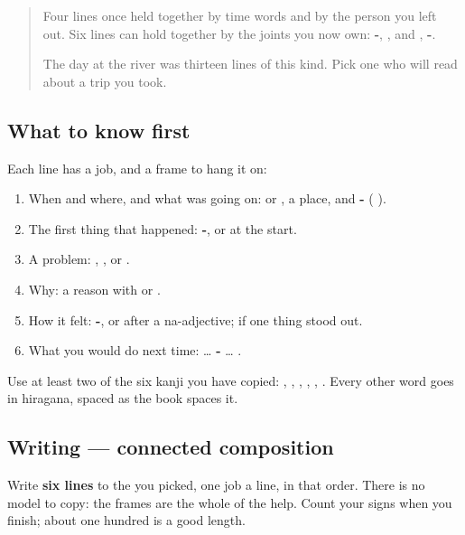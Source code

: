 \begin{quote}
Four lines once held together by time words and by the person you left out. Six lines can hold together by the joints you now own: \textbf{-}, \textbf{}, \textbf{} and \textbf{}, \textbf{-}.

The day at the river was thirteen lines of this kind. Pick one \textbf{} who will read about a trip you took.
\end{quote}

\subsection*{What to know first}
Each line has a job, and a frame to hang it on:

\begin{enumerate}
\raggedright
  \item When and where, and what was going on: \textbf{} or \textbf{}, a place, and \textbf{-} (\textbf{ }).
  \item The first thing that happened: \textbf{-}, or \textbf{} at the start.
  \item A problem: \textbf{}, \textbf{}, or \textbf{}.
  \item Why: a reason with \textbf{} or \textbf{}.
  \item How it felt: \textbf{-}, or \textbf{} after a na-adjective; \textbf{} if one thing stood out.
  \item What you would do next time: \textbf{} … \textbf{-} … \textbf{ }.
\end{enumerate}

Use at least two of the six kanji you have copied: \textbf{}, \textbf{}, \textbf{}, \textbf{}, \textbf{}, \textbf{}. Every other word goes in hiragana, spaced as the book spaces it.

\subsection*{Writing — connected composition}
Write \textbf{six lines} to the \textbf{} you picked, one job a line, in that order. There is no model to copy: the frames are the whole of the help. Count your signs when you finish; about one hundred is a good length.

